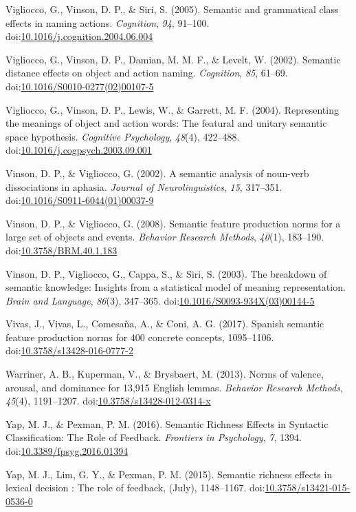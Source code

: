 \documentclass[english,man]{apa6}
\theoremstyle{definition}
\theoremstyle{definition}
\theoremstyle{definition}
\theoremstyle{remark}
\begin{document}
\hypertarget{ref-Vigliocco2005}{}
Vigliocco, G., Vinson, D. P., \& Siri, S. (2005). Semantic and
grammatical class effects in naming actions. \emph{Cognition},
\emph{94}, 91--100.
doi:\href{https://doi.org/10.1016/j.cognition.2004.06.004}{10.1016/j.cognition.2004.06.004}

\hypertarget{ref-Vigliocco2002}{}
Vigliocco, G., Vinson, D. P., Damian, M. M. F., \& Levelt, W. (2002).
Semantic distance effects on object and action naming. \emph{Cognition},
\emph{85}, 61--69.
doi:\href{https://doi.org/10.1016/S0010-0277(02)00107-5}{10.1016/S0010-0277(02)00107-5}

\hypertarget{ref-Vigliocco2004}{}
Vigliocco, G., Vinson, D. P., Lewis, W., \& Garrett, M. F. (2004).
Representing the meanings of object and action words: The featural and
unitary semantic space hypothesis. \emph{Cognitive Psychology},
\emph{48}(4), 422--488.
doi:\href{https://doi.org/10.1016/j.cogpsych.2003.09.001}{10.1016/j.cogpsych.2003.09.001}

\hypertarget{ref-Vinson2002}{}
Vinson, D. P., \& Vigliocco, G. (2002). A semantic analysis of noun-verb
dissociations in aphasia. \emph{Journal of Neurolinguistics}, \emph{15},
317--351.
doi:\href{https://doi.org/10.1016/S0911-6044(01)00037-9}{10.1016/S0911-6044(01)00037-9}

\hypertarget{ref-Vinson2008}{}
Vinson, D. P., \& Vigliocco, G. (2008). Semantic feature production
norms for a large set of objects and events. \emph{Behavior Research
Methods}, \emph{40}(1), 183--190.
doi:\href{https://doi.org/10.3758/BRM.40.1.183}{10.3758/BRM.40.1.183}

\hypertarget{ref-Vinson2003}{}
Vinson, D. P., Vigliocco, G., Cappa, S., \& Siri, S. (2003). The
breakdown of semantic knowledge: Insights from a statistical model of
meaning representation. \emph{Brain and Language}, \emph{86}(3),
347--365.
doi:\href{https://doi.org/10.1016/S0093-934X(03)00144-5}{10.1016/S0093-934X(03)00144-5}

\hypertarget{ref-Vivas2017}{}
Vivas, J., Vivas, L., Comesaña, A., \& Coni, A. G. (2017). Spanish
semantic feature production norms for 400 concrete concepts, 1095--1106.
doi:\href{https://doi.org/10.3758/s13428-016-0777-2}{10.3758/s13428-016-0777-2}

\hypertarget{ref-Warriner2013}{}
Warriner, A. B., Kuperman, V., \& Brysbaert, M. (2013). Norms of
valence, arousal, and dominance for 13,915 English lemmas.
\emph{Behavior Research Methods}, \emph{45}(4), 1191--1207.
doi:\href{https://doi.org/10.3758/s13428-012-0314-x}{10.3758/s13428-012-0314-x}

\hypertarget{ref-Yap2016}{}
Yap, M. J., \& Pexman, P. M. (2016). Semantic Richness Effects in
Syntactic Classification: The Role of Feedback. \emph{Frontiers in
Psychology}, \emph{7}, 1394.
doi:\href{https://doi.org/10.3389/fpsyg.2016.01394}{10.3389/fpsyg.2016.01394}

\hypertarget{ref-Yap2015}{}
Yap, M. J., Lim, G. Y., \& Pexman, P. M. (2015). Semantic richness
effects in lexical decision : The role of feedback, (July), 1148--1167.
doi:\href{https://doi.org/10.3758/s13421-015-0536-0}{10.3758/s13421-015-0536-0}
\end{document}
